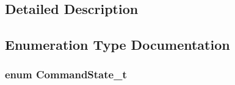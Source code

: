 \subsection{Detailed Description}


\subsection{Enumeration Type Documentation}
\hypertarget{group__command__state_ga3a4df4a38f022d20e1627e722433ecc2}{
\subsubsection[{Command\-State\-\_\-t}]{\setlength{\rightskip}{0pt plus 5cm}enum {\bf Command\-State\-\_\-t}}}\label{group__command__state_ga3a4df4a38f022d20e1627e722433ecc2}
